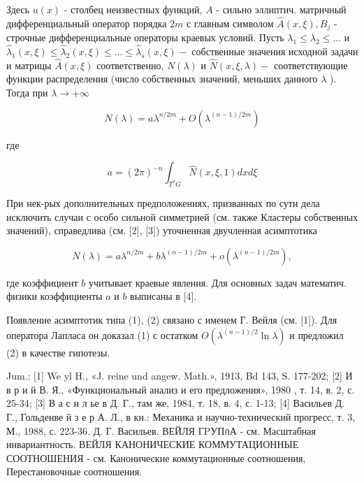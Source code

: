 \documentclass[10pt]{article}
\begin{document}
Здесь $u(x)$ - столбец неизвестных функций, $A$ - сильно эллиптич. матричный дифференциальный оператор порядка $2 m$ с главным символом $\hat{A}(x, \xi), B_{j}$ - строчные дифференциальные операторы краевых условий. Пусть $\lambda_{1} \leqslant \lambda_{2} \leqslant \ldots$ и $\hat{\lambda}_{1}(x, \xi) \leqslant \hat{\lambda}_{2}(x, \xi) \leqslant \ldots \leqslant \hat{\lambda}_{s}(x, \xi)-$ собственные значения исходной задачи и матрицы $\hat{A}(x, \xi)$ соответственно, $N(\lambda)$ и $\hat{N}(x, \xi, \lambda)-$ соответствующие функции распределения (число собственных значений, меньших данного $\lambda$ ). Тогда при $\lambda \rightarrow+\infty$



\[

N(\lambda)=a \lambda^{n / 2 m}+O\left(\lambda^{(n-1) / 2 m}\right)

\]



где



\[

a=(2 \pi)^{-n} \int_{T^{*} G} \hat{N}(x, \xi, 1) d x d \xi

\]



При нек-рых дополнительных предположениях, призванных по сути дела исключить случаи с особо сильной симметрией (см. также Кластеры собственных значений), справедлива (см. [2], [3]) уточненная двучленная асимптотика



\[

N(\lambda)=a \lambda^{n / 2 m}+b \lambda^{(n-1) / 2 m}+o\left(\lambda^{(n-1) / 2 m}\right),

\]



где коэффициент $b$ учитывает краевые явления. Для основных задач математич. физики коэффициенты $a$ и $b$ выписаны в [4].



Появление асимптотик типа (1), (2) связано с именем Г. Вейля (см. [1]). Для оператора Лапласа он доказал (1) с остатком $O\left(\lambda^{(n-1) / 2} \ln \lambda\right)$ и предложил (2) в качестве гипотезы.



Jum.: [1] We yl H., «J. reine und angew. Math.», 1913, Bd 143, S. 177-202; [2] И в р и й В. Я., «Функциональный анализ и его предложения», 1980 , т. 14, в. 2, с. 25-34; [3] В а с и л ье в Д. Г., там же, 1984, т. 18, в. 4, с. 1-13; [4] Васильев Д. Г., Гольденве й з е р А. Л., в кн.: Механика и научно-технический прогресс, т. 3, М., 1988, с. 223-36. Д. Г. Васильев. ВЕЙЛЯ ГPУПกА - см. Масштабная инвариантность. ВЕЙЛЯ КАНОНИЧЕСКИЕ КОММУТАЦИОННЫЕ СООТНОШЕНИЯ - см. Канонические коммутационные соотношения, Перестановочные соотношения.
\end{document}

